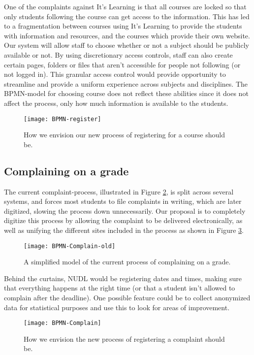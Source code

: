 \noindent
One of the complaints against It's Learning is that all courses are locked so that only students following the course can get access to the information. This has led to a 
fragmentation between courses using It's Learning to provide the students with information and resources, and the courses which provide their own website. Our system will allow staff
to choose whether or not a subject should be publicly available or not. By using discretionary access controls, staff can also create certain pages, folders or files that aren't accessible for people not following (or not logged in). This granular access control would provide opportunity to streamline and provide a uniform experience across subjects and disciplines. The BPMN-model for choosing course does not reflect these abilities since it does not affect the process, only how much information is available to the students. 

\begin{figure}[H]
    \centering
    \texttt{[image: BPMN-register]}
    \caption{How we envision our new process of registering for a course should be.}
    \label{fig:Register-new}
\end{figure}

\subsection{Complaining on a grade}
	The current complaint-process, illustrated in Figure \ref{fig:Complain-old}, is split across several systems, and forces most students to file complaints in writing,
which are later digitized, slowing the process down unnecessarily. Our proposal is to completely digitize this process by allowing the complaint to be delivered electronically,
as well as unifying the different sites included in the process as shown in Figure \ref{fig:Complain-new}.\\

\begin{figure}[H]
    \centering
    \texttt{[image: BPMN-Complain-old]}
    \caption{A simplified model of the current process of complaining on a grade.}
    \label{fig:Complain-old}
\end{figure}
\noindent
Behind the curtains, NUDL would be registering dates and times, making sure that everything happens at the right time (or that a student isn't allowed to complain after the deadline). One possible feature could be to collect anonymized data for statistical purposes and use this to look for areas of improvement.

\begin{figure}[H]
    \centering
    \texttt{[image: BPMN-Complain]}
    \caption{How we envision the new process of registering a complaint should be.}
    \label{fig:Complain-new}
\end{figure}
